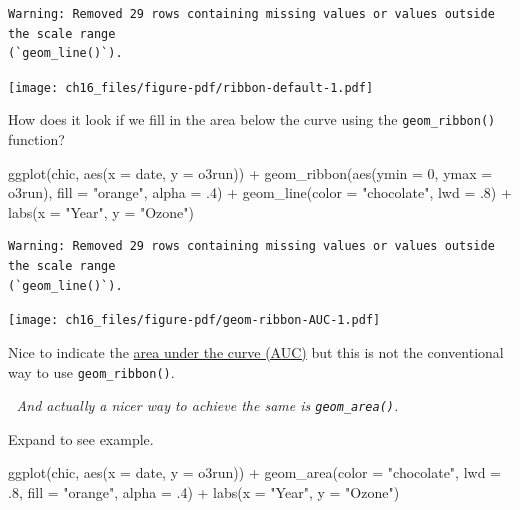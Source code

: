 \documentclass[
  letterpaper,
  DIV=11,
  numbers=noendperiod]{scrreprt}
\newenvironment{Shaded}{\begin{snugshade}}{\end{snugshade}}
\newcommand{\AttributeTok}[1]{\textcolor[rgb]{0.40,0.45,0.13}{#1}}
\newcommand{\DecValTok}[1]{\textcolor[rgb]{0.68,0.00,0.00}{#1}}
\newcommand{\FunctionTok}[1]{\textcolor[rgb]{0.28,0.35,0.67}{#1}}
\newcommand{\NormalTok}[1]{\textcolor[rgb]{0.00,0.23,0.31}{#1}}
\newcommand{\SpecialCharTok}[1]{\textcolor[rgb]{0.37,0.37,0.37}{#1}}
\newcommand{\StringTok}[1]{\textcolor[rgb]{0.13,0.47,0.30}{#1}}
\begin{document}
\begin{verbatim}
Warning: Removed 29 rows containing missing values or values outside the scale range
(`geom_line()`).
\end{verbatim}

\texttt{[image: ch16\_files/figure-pdf/ribbon-default-1.pdf]}

How does it look if we fill in the area below the curve using the
\texttt{geom\_ribbon()} function?

\begin{Shaded}
\begin{Highlighting}[]
\FunctionTok{ggplot}\NormalTok{(chic, }\FunctionTok{aes}\NormalTok{(}\AttributeTok{x =}\NormalTok{ date, }\AttributeTok{y =}\NormalTok{ o3run)) }\SpecialCharTok{+}
   \FunctionTok{geom\_ribbon}\NormalTok{(}\FunctionTok{aes}\NormalTok{(}\AttributeTok{ymin =} \DecValTok{0}\NormalTok{, }\AttributeTok{ymax =}\NormalTok{ o3run),}
               \AttributeTok{fill =} \StringTok{"orange"}\NormalTok{, }\AttributeTok{alpha =}\NormalTok{ .}\DecValTok{4}\NormalTok{) }\SpecialCharTok{+}
   \FunctionTok{geom\_line}\NormalTok{(}\AttributeTok{color =} \StringTok{"chocolate"}\NormalTok{, }\AttributeTok{lwd =}\NormalTok{ .}\DecValTok{8}\NormalTok{) }\SpecialCharTok{+}
   \FunctionTok{labs}\NormalTok{(}\AttributeTok{x =} \StringTok{"Year"}\NormalTok{, }\AttributeTok{y =} \StringTok{"Ozone"}\NormalTok{)}
\end{Highlighting}
\end{Shaded}

\begin{verbatim}
Warning: Removed 29 rows containing missing values or values outside the scale range
(`geom_line()`).
\end{verbatim}

\texttt{[image: ch16\_files/figure-pdf/geom-ribbon-AUC-1.pdf]}

Nice to indicate the
\href{https://en.wikipedia.org/wiki/Area_under_the_curve_(pharmacokinetics)}{area
under the curve (AUC)} but this is not the conventional way to use
\texttt{geom\_ribbon()}.

💁 \emph{And actually a nicer way to achieve the same is
\texttt{geom\_area()}.}

Expand to see example.

\begin{Shaded}
\begin{Highlighting}[]
\FunctionTok{ggplot}\NormalTok{(chic, }\FunctionTok{aes}\NormalTok{(}\AttributeTok{x =}\NormalTok{ date, }\AttributeTok{y =}\NormalTok{ o3run)) }\SpecialCharTok{+}
   \FunctionTok{geom\_area}\NormalTok{(}\AttributeTok{color =} \StringTok{"chocolate"}\NormalTok{, }\AttributeTok{lwd =}\NormalTok{ .}\DecValTok{8}\NormalTok{,}
             \AttributeTok{fill =} \StringTok{"orange"}\NormalTok{, }\AttributeTok{alpha =}\NormalTok{ .}\DecValTok{4}\NormalTok{) }\SpecialCharTok{+}
   \FunctionTok{labs}\NormalTok{(}\AttributeTok{x =} \StringTok{"Year"}\NormalTok{, }\AttributeTok{y =} \StringTok{"Ozone"}\NormalTok{)}
\end{Highlighting}
\end{Shaded}
\end{document}
